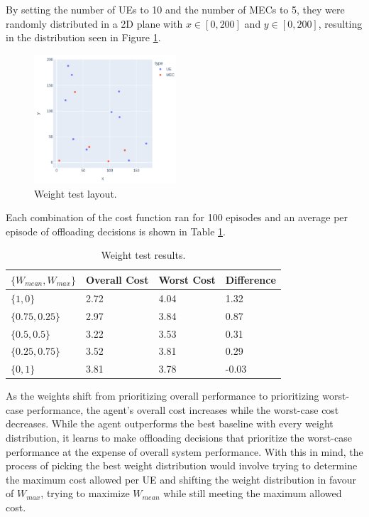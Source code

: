 \documentclass[conference]{IEEEtran}
\begin{document}
By setting the number of \acrshort{UE}s to 10 and the number of \acrshort{MEC}s to 5, they were randomly distributed in a 2D plane with $x \in [0, 200]$ and $y \in [0, 200]$, resulting in the distribution seen in Figure \ref{weight_test}.

\begin{figure}[H]
  \centering
  \includegraphics[width=200px]{images/5_10_layout.png}
  \caption{Weight test layout.}  \label{weight_test}
\end{figure}

Each combination of the cost function ran for 100 episodes and an average per episode of offloading decisions is shown in Table \ref{weight_table}.

\begin{table}[H]
\centering
\begin{tabular}{|l|l|l|l|}
\hline
$\{W_{mean}, W_{max}\}$ & Overall Cost & Worst Cost & Difference \\ \hline
$\{1, 0\}$       & 2.72 & 4.04 & 1.32\\
$\{0.75, 0.25\}$  & 2.97 & 3.84  & 0.87\\
$\{0.5, 0.5\}$ & 3.22 & 3.53 & 0.31\\ 
$\{0.25, 0.75\}$ & 3.52 & 3.81 & 0.29\\ 
$\{0, 1\}$ & 3.81 & 3.78 & -0.03 \\ \hline
\end{tabular}
\caption{Weight test results.} \label{weight_table}
\end{table}

As the weights shift from prioritizing overall performance to prioritizing worst-case performance, the agent's overall cost increases while the worst-case cost decreases. While the agent outperforms the best baseline with every weight distribution, it learns to make offloading decisions that prioritize the worst-case performance at the expense of overall system performance. With this in mind, the process of picking the best weight distribution would involve trying to determine the maximum cost allowed per \acrshort{UE} and shifting the weight distribution in favour of $W_{max}$, trying to maximize $W_{mean}$ while still meeting the maximum allowed cost.
\end{document}
